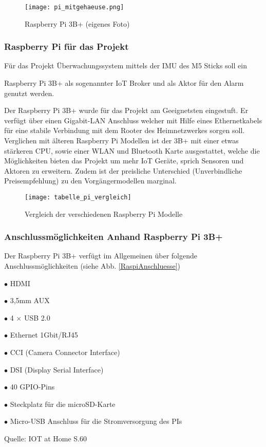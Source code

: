 \documentclass[a4paper,12pt]{article}
\begin{document}
	\begin{figure}[H]
	\centering
	\texttt{[image: pi\_mitgehaeuse.png]}
	\caption{Raspberry Pi 3B+ (eigenes Foto)}
	\label{pi_mitgehaeuse}
\end{figure}	


\subsubsection{Raspberry Pi für das Projekt}
Für das Projekt Überwachungssystem mittels der IMU des M5 Sticks soll ein\par 
Raspberry Pi 3B+ als sogenannter IoT Broker und als Aktor für den Alarm genutzt werden.\par
Der Raspberry Pi 3B+ wurde für das Projekt am Geeignetsten eingestuft. Er verfügt über einen Gigabit-LAN Anschluss welcher mit Hilfe eines Ethernetkabels für eine stabile Verbindung mit dem Rooter des Heimnetzwerkes sorgen soll. Verglichen mit älteren Raspberry Pi Modellen ist der 3B+ mit einer etwas stärkeren CPU, sowie einer WLAN und Bluetooth Karte ausgestattet, welche die Möglichkeiten bieten das Projekt um mehr IoT Geräte, sprich Sensoren und Aktoren zu erweitern. Zudem ist der preisliche Unterschied (Unverbindliche Preisempfehlung) zu den Vorgängermodellen marginal.  

	\begin{figure}[H]
	\centering
	\texttt{[image: tabelle\_pi\_vergleich]}
	\caption{Vergleich der verschiedenen Raspberry Pi Modelle \protect\cite[S. 59]{Huwe.2019}}
	\label{tabelle_pi_vergleich}
\end{figure}


\subsubsection{Anschlussmöglichkeiten Anhand Raspberry Pi 3B+}
Der Raspberry Pi 3B+ verfügt im Allgemeinen über folgende Anschlussmöglichkeiten (siehe Abb. \ref{RaspiAnschluesse})\par 
$\bullet$ HDMI   \par %
$\bullet$ 3,5mm AUX\par 
$\bullet$ 4 $\times$ USB 2.0 \par 
$\bullet$ Ethernet 1Gbit/RJ45\par 
$\bullet$ CCI (Camera Connector Interface)\par 
$\bullet$  DSI (Display Serial Interface)\par
$\bullet$ 40 GPIO-Pins\par
$\bullet$ Steckplatz für die microSD-Karte\par
$\bullet$ Micro-USB Anschluss für die Stromversorgung des PIs\par
Quelle: IOT at Home S.60\par
\end{document}
